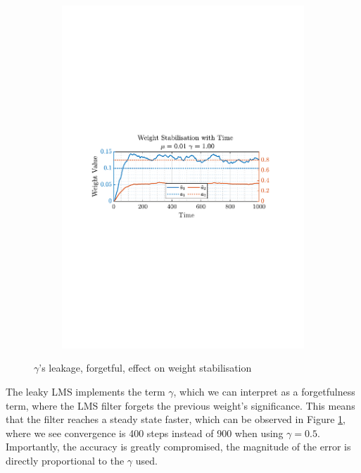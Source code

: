 \documentclass[12pt]{article}
\begin{document}
\begin{figure}[H]
\begin{subfigure}{0.49\textwidth}
					\includegraphics[trim={2.2cm 11.2cm 3.00cm  11.2cm}, clip, width=\textwidth]{../MATLAB/figures/q2_1f_fig08.pdf} 
					\captionsetup{justification=centering}
				\end{subfigure}
				\captionsetup{justification=centering}
				\caption{$\gamma$'s leakage, forgetful, effect on weight stabilisation}
				\label{fig: 2-1f}
			\end{figure}
		
		The leaky LMS implements the term $\gamma$, which we can interpret as a forgetfulness term, where the LMS filter forgets the previous weight's significance. This means that the filter reaches a steady state faster, which can be observed in Figure \ref{fig: 2-1f}, where we see convergence is 400 steps instead of 900 when using $\gamma=0.5$. \\
		Importantly, the accuracy is greatly compromised, the magnitude of the error is directly proportional to the $\gamma$ used.
		 
\end{document}
